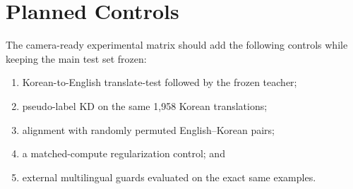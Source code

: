 \documentclass[10pt,twocolumn]{article}
\begin{document}
\section{Planned Controls}

The camera-ready experimental matrix should add the following controls while
keeping the main test set frozen:
\begin{enumerate}
    \item Korean-to-English translate-test followed by the frozen teacher;
    \item pseudo-label KD on the same 1,958 Korean translations;
    \item alignment with randomly permuted English--Korean pairs;
    \item a matched-compute regularization control; and
    \item external multilingual guards evaluated on the exact same examples.
\end{enumerate}
\end{document}
